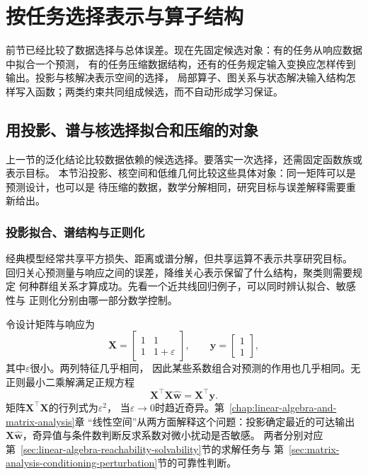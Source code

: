 \section{按任务选择表示与算子结构}
\label{sec:future-representation-structure}

前节已经比较了数据选择与总体误差。现在先固定候选对象：有的任务从响应数据中拟合一个预测，
有的任务压缩数据结构，还有的任务规定输入变换应怎样传到输出。投影与核解决表示空间的选择，
局部算子、图关系与状态解决输入结构怎样写入函数；两类约束共同组成候选，而不自动形成学习保证。

\subsection{用投影、谱与核选择拟合和压缩的对象}
\label{sec:future-classical-kernel-geometric-representation}

上一节的泛化结论比较数据依赖的候选选择。要落实一次选择，还需固定函数族或表示目标。
本节沿投影、核空间和低维几何比较这些具体对象：同一矩阵可以是预测设计，也可以是
待压缩的数据，数学分解相同，研究目标与误差解释需要重新给出。

\subsubsection{投影拟合、谱结构与正则化}
\label{sec:future-fitting-projection-regularization}

经典模型经常共享平方损失、距离或谱分解，但共享运算不表示共享研究目标。
回归关心预测量与响应之间的误差，降维关心表示保留了什么结构，聚类则需要规定
何种群组关系才算成功。先看一个近共线回归例子，可以同时辨认拟合、敏感性与
正则化分别由哪一部分数学控制。

令设计矩阵与响应为
\[
  \bm{X}
  =
  \begin{bmatrix}
    1 & 1\\
    1 & 1+\varepsilon
  \end{bmatrix},
  \qquad
  \bm{y}
  =
  \begin{bmatrix}
    1\\
    1
  \end{bmatrix},
\]
其中$\varepsilon$很小。两列特征几乎相同，
因此某些系数组合对预测的作用也几乎相同。无正则最小二乘解满足正规方程
\[
  \bm{X}^{\top}\bm{X}\widehat{\bm{w}}
  =
  \bm{X}^{\top}\bm{y}.
\]
矩阵$\bm{X}^{\top}\bm{X}$的行列式为$\varepsilon^2$，
当$\varepsilon\to0$时趋近奇异。第~\ref{chap:linear-algebra-and-matrix-analysis}章
“线性空间”从两方面解释这个问题：投影确定最近的可达输出
$\bm{X}\widehat{\bm{w}}$，奇异值与条件数判断反求系数对微小扰动是否敏感。
两者分别对应第~\ref{sec:linear-algebra-reachability-solvability}节的求解任务与
第~\ref{sec:matrix-analysis-conditioning-perturbation}节的可靠性判断。

